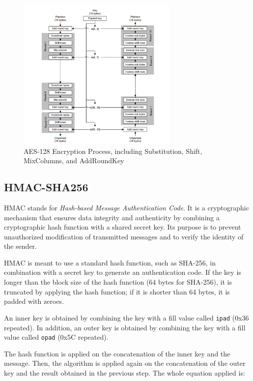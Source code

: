 \begin{figure}[H]
	\centering
	\includegraphics[width=0.7\textwidth]{imaxes/aes-128.png}
	\caption{AES-128 Encryption Process, including Substitution, Shift, MixColumns, and AddRoundKey}
	\label{fig:aes128}
\end{figure}


\subsection{HMAC-SHA256}
\label{subsec:hmac}

HMAC stands for \textit{Hash-based Message Authentication Code}. It is a cryptographic mechanism that ensures data integrity and authenticity by combining a cryptographic hash function with a shared secret key. Its purpose is to prevent unauthorized modification of transmitted messages and to verify the identity of the sender.

HMAC is meant to use a standard hash function, such as SHA-256, in combination with a secret key to generate an authentication code. If the key is longer than the block size of the hash function (64 bytes for SHA-256), it is truncated by applying the hash function; if it is shorter than 64 bytes, it is padded with zeroes.

An inner key is obtained by combining the key with a fill value called \texttt{ipad} (0x36 repeated). In addition, an outer key is obtained by combining the key with a fill value called \texttt{opad} (0x5C repeated).

The hash function is applied on the concatenation of the inner key and the message.  
Then, the algorithm is applied again on the concatenation of the outer key and the result obtained in the previous step. The whole equation applied is:


